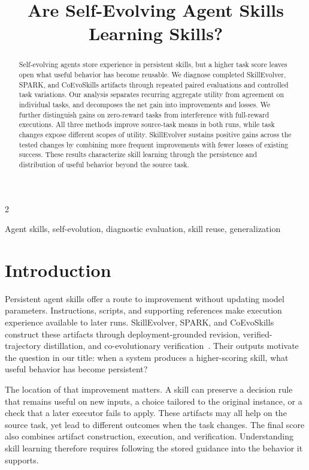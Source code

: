 \documentclass[10pt,letterpaper]{article}
\title{Are Self-Evolving Agent Skills Learning Skills?}
\begin{document}
\ninept

\maketitle
\begin{multicols}{2}

\begin{abstract}

Self-evolving agents store experience in persistent skills, but a higher task score leaves open what useful behavior has become reusable. We diagnose completed SkillEvolver, SPARK, and CoEvoSkills artifacts through repeated paired evaluations and controlled task variations. Our analysis separates recurring aggregate utility from agreement on individual tasks, and decomposes the net gain into improvements and losses. We further distinguish gains on zero-reward tasks from interference with full-reward executions. All three methods improve source-task means in both runs, while task changes expose different scopes of utility. SkillEvolver sustains positive gains across the tested changes by combining more frequent improvements with fewer losses of existing success. These results characterize skill learning through the persistence and distribution of useful behavior beyond the source task.

\end{abstract}

\begin{keywords}
Agent skills, self-evolution, diagnostic evaluation, skill reuse, generalization
\end{keywords}

\section{Introduction}

Persistent agent skills offer a route to improvement without updating model parameters. Instructions, scripts, and supporting references make execution experience available to later runs. SkillEvolver, SPARK, and CoEvoSkills construct these artifacts through deployment-grounded revision, verified-trajectory distillation, and co-evolutionary verification~\cite{zhang2026skillevolver,zhou2026spark,zhang2026coevoskills}. Their outputs motivate the question in our title: when a system produces a higher-scoring skill, what useful behavior has become persistent?

The location of that improvement matters. A skill can preserve a decision rule that remains useful on new inputs, a choice tailored to the original instance, or a check that a later executor fails to apply. These artifacts may all help on the source task, yet lead to different outcomes when the task changes. The final score also combines artifact construction, execution, and verification. Understanding skill learning therefore requires following the stored guidance into the behavior it supports.


\end{multicols}
\end{document}
